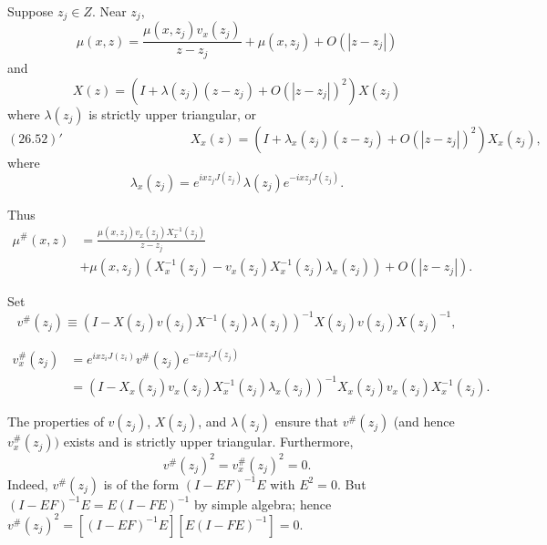 \documentclass{surv-l}
\theoremstyle{plain}
\theoremstyle{definition}
\numberwithin{equation}{chapter}
\begin{document}
Suppose $z_{j}\in Z$. Near $z_{j}$,
\begin{equation}\label{eq26.51}
\mu(x,z)=\frac{\mu(x,z_{j})v_{x}(z_{j})}{z-z_{j}}+\mu(x, z_{j})+O(|z-z_{j}|)
\end{equation}
and
\begin{equation}\label{eq26.52}
X(z)=(I+\lambda(z_{j})(z-z_{j})+O(|z-z_{j}|)^{2})X(z_{j})
\end{equation}
where $\lambda(z_{j})$ is strictly upper triangular, or
\begin{equation*}
(26.52)'\qquad\qquad\qquad\qquad\qquad X_{x}(z)=(I+\lambda_{x}(z_{j})(z-z_{j})+O(|z-z_{j}|)^{2})X_{x}(z_{j}),
\end{equation*}
where
\renewcommand\theequation{26.\arabic{equation}}
\setcounter{equation}{52}
\begin{equation}\label{eq26.53}
\lambda_{x}(z_{j})=e^{ixz_{j}J(z_{j})}\lambda(z_{j})e^{-ixz_{j}J(z_{j})}.
\end{equation}

Thus
\begin{align}\label{eq26.54}
\displaystyle \mu^{\#}(x,z)&=\frac{\mu(x,z_{j})v_{x}(z_{j})X_{x}^{-1}(z_{j})}{z-z_{j}}\\ \nonumber
&+\mu(x, z_{j})(X_{x}^{-1}(z_{j})-v_{x}(z_{j})X_{x}^{-1}(z_{j})\lambda_{x}(z_{j}))+O(|z-z_{j}|).
\end{align}

Set
\begin{equation}\label{eq26.55}
v^{\#}(z_{j})\equiv(I-X(z_{j})v(z_{j})X^{-1}(z_{j})\lambda(z_{j}))^{-1}X(z_{j})v(z_{j})X(z_{j})^{-1},
\end{equation}

\begin{align}\label{al26.56}
v_{x}^{\#}(z_{j})&=e^{ixz_{i}J(z_{i})}v^{\#}(z_{j})e^{-ixz_{j}J(z_{j})}\\ \nonumber
&=(I-X_{x}(z_{j})v_{x}(z_{j})X_{x}^{-1}(z_{j})\lambda_{x}(z_{j}))^{-1}X_{x}(z_{j})v_{x}(z_{j})X_{x}^{-1}(z_{j}).
\end{align}

The properties of $v(z_{j})$, $X(z_{j})$, and $\lambda(z_{j})$ ensure that $v^{\#}(z_{j})$ (and hence $v_{x}^{\#}(z_{j}))$ exists and is strictly upper triangular. Furthermore,
\begin{equation}\label{eq26.57}
v^{\#}(z_{j})^{2}=v_{x}^{\#}(z_{j})^{2}=0.
\end{equation}
Indeed, $v^{\#}(z_{j})$ is of the form $(I-EF)^{-1}E$ with $E^{2}=0$. But $(I-EF)^{-1}E= E(I-FE)^{-1}$ by simple algebra; hence $v^{\#}(z_{j})^{2}=[(I-EF)^{-1}E][E(I-FE)^{-1}] =0$.
\end{document}
